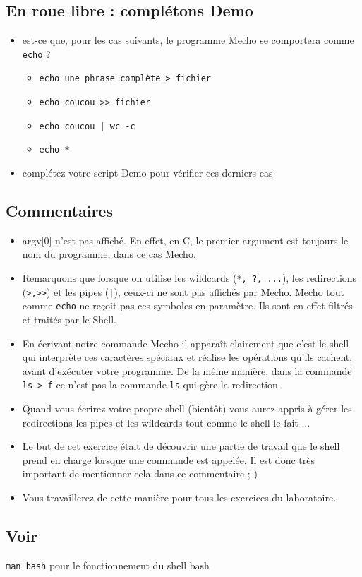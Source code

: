 \subsection{En roue libre : complétons Demo}
\begin{itemize}
\item est-ce que, pour les cas suivants, le programme Mecho se comportera comme \texttt{echo} ?
\begin{itemize}
\item \texttt{echo une phrase complète > fichier}
\item \texttt{echo coucou >{}> fichier}
\item \texttt{echo coucou | wc -c}
\item \texttt{echo *}
\end{itemize}
\item complétez votre script Demo pour vérifier ces derniers cas
\end{itemize}

\subsection{Commentaires}

\begin{itemize}
\item argv[0] n'est pas affiché. En effet, en C, le premier argument est toujours le nom du programme, dans ce cas Mecho.
\item Remarquons que lorsque on utilise les wildcards (\texttt{*, ?, ...}), les redirections (\texttt{>,>{}>}) et les pipes (\texttt{|}), ceux-ci ne sont pas affichés par Mecho. Mecho tout comme \texttt{echo} ne reçoit pas ces symboles en paramètre. Ils sont en effet filtrés et traités par le Shell. 
\item En écrivant notre commande Mecho il apparaît clairement que c'est le shell qui interprète ces caractères spéciaux et réalise les opérations qu'ils cachent, avant d'exécuter votre programme. De la même manière, dans la commande \texttt{ls > f} ce n'est pas la commande \texttt{ls} qui gère la redirection.
\item Quand vous écrirez votre propre shell (bientôt) vous aurez appris à gérer les redirections les pipes et les wildcards tout comme le shell le fait ...
\item Le but de cet exercice était de découvrir une partie de travail que le shell prend en charge lorsque une commande est appelée. Il est donc très important de mentionner cela dans ce commentaire ;-)
\item Vous travaillerez de cette manière pour tous les exercices du laboratoire.
\end{itemize}
\subsection{Voir}
\texttt{man bash} pour le fonctionnement du shell bash
\newpage
